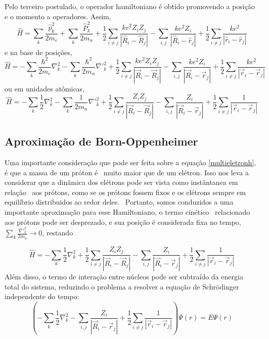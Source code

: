 Pelo terceiro postulado, o operador hamiltoniano é obtido promovendo a posição e o momento a operadores. Assim, 
\begin{equation}
    \hat H =  \sum_k \frac{\hat p_{k}^2}{2m_e} + \sum_k \frac{\hat P_{k}^2}{2m_n} + \frac{1}{2} \sum_{i \neq j} \frac{k e^2 Z_i Z_j}{|\hat R_i-\hat R_j|} - \sum_{i,j} \frac{k e^2 Z_i}{|\hat{R}_i-\hat{r}_j|} + \frac{1}{2} \sum_{i\neq j} \frac{ke^2}{|\hat{r}_i - \hat{r}_j|}
\end{equation}
e na base de posições,
\begin{equation}
    \hat H = - \sum_k \frac{\hbar^2}{2m_e}\nabla^2_{k} - \sum_k \frac{\hbar^2}{2m_n}\nabla'^2_{k} + \frac{1}{2} \sum_{i \neq j} \frac{k e^2 Z_i Z_j}{|\vec{R}_i-\vec{R}_j|} - \sum_{i,j} \frac{k e^2 Z_i}{|\vec{R}_i-\vec{r}_j|} + \frac{1}{2} \sum_{i\neq j} \frac{ke^2}{|\vec{r}_i - \vec{r}_j|}
\end{equation}
ou em unidades atômicas,
\begin{equation}
    \label{multieletronh}
    \hat H = - \sum_k \frac{1}{2}\nabla^2_{k} - \sum_k \frac{1}{2m_n}\nabla'^2_{k} + \frac{1}{2} \sum_{i \neq j} \frac{Z_i Z_j}{|\vec{R}_i-\vec{R}_j|} - \sum_{i,j} \frac{Z_i}{|\vec{R}_i-\vec{r}_j|} + \frac{1}{2} \sum_{i\neq j} \frac{1}{|\vec{r}_i - \vec{r}_j|}
\end{equation}
\subsection{Aproximação de Born-Oppenheimer}

Uma importante consideração que pode ser feita sobre a equação \ref{multieletronh}, é que a massa de um próton é \
muito maior que de um elétron. Isso nos leva a considerar que a dinâmica dos elétrons pode ser vista como instântanea em relação \
aos prótons, como se os prótons fossem fixos e os elétrons sempre em equilíbrio distribuidos ao redor deles. \
Portanto, somos conduzidos a uma importante aproximação para esse Hamiltoniano, o termo cinético \
relacionado aos prótons pode ser desprezado, e sua posição é considerada fixa no tempo, $\sum_k \frac{\nabla'^2_{k}}{2m_n} \to 0$, restando

\begin{equation}
    \hat H = -\sum_k \frac{1}{2}\nabla^2_{k} + \frac{1}{2} \sum_{i \neq j} \frac{Z_i Z_j}{|\vec{R}_i-\vec{R}_j|} - \sum_{i,j} \frac{Z_i}{|\vec{R}_i-\vec{r}_j|} + \frac{1}{2} \sum_{i\neq j} \frac{1}{|\vec{r}_i - \vec{r}_j|}
\end{equation}
Além disso, o termo de interação entre núcleos pode ser subtraído da energia total do sistema, reduzindo o problema a resolver a equação de Schrödinger independente do tempo:
\begin{equation}
    \label{BOeq}
    \left(-\sum_k \frac{1}{2}\nabla^2_{k} - \sum_{i,j} \frac{Z_i}{|\vec{R}_i-\vec{r}_j|} + \frac{1}{2} \sum_{i\neq j} \frac{1}{|\vec{r}_i - \vec{r}_j|} \right) \Psi(r) = E \Psi(r)
\end{equation}

